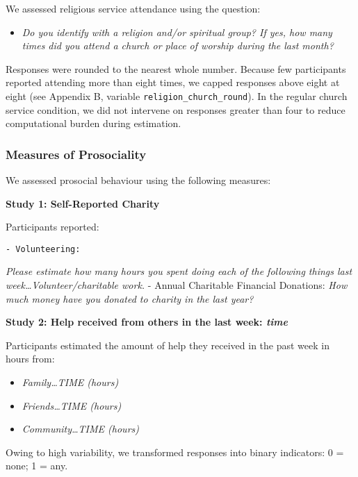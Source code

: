 \documentclass[
  single column]{article}
\providecommand{\tightlist}{%
  \setlength{\itemsep}{0pt}\setlength{\parskip}{0pt}}\usepackage{longtable,booktabs,array}
\begin{document}
We assessed religious service attendance using the question:

\begin{itemize}
\tightlist
\item
  \emph{Do you identify with a religion and/or spiritual group? If yes,
  how many times did you attend a church or place of worship during the
  last month?}
\end{itemize}

Responses were rounded to the nearest whole number. Because few
participants reported attending more than eight times, we capped
responses above eight at eight (see Appendix B, variable
\texttt{religion\_church\_round}). In the regular church service
condition, we did not intervene on responses greater than four to reduce
computational burden during estimation.

\subsubsection{Measures of Prosociality}\label{measures-of-prosociality}

We assessed prosocial behaviour using the following measures:

\textbf{Study 1: Self-Reported Charity}

Participants reported:

\begin{verbatim}
- Volunteering: 
\end{verbatim}

\emph{Please estimate how many hours you spent doing each of the
following things last week\ldots Volunteer/charitable work.} - Annual
Charitable Financial Donations: \emph{How much money have you donated to
charity in the last year?}

\textbf{Study 2: Help received from others in the last week: \emph{time}
}

Participants estimated the amount of help they received in the past week
in hours from:

\begin{itemize}
\tightlist
\item
  \emph{Family\ldots TIME (hours)}
\item
  \emph{Friends\ldots TIME (hours)}
\item
  \emph{Community\ldots TIME (hours)}
\end{itemize}

Owing to high variability, we transformed responses into binary
indicators: 0 = none; 1 = any.
\end{document}
